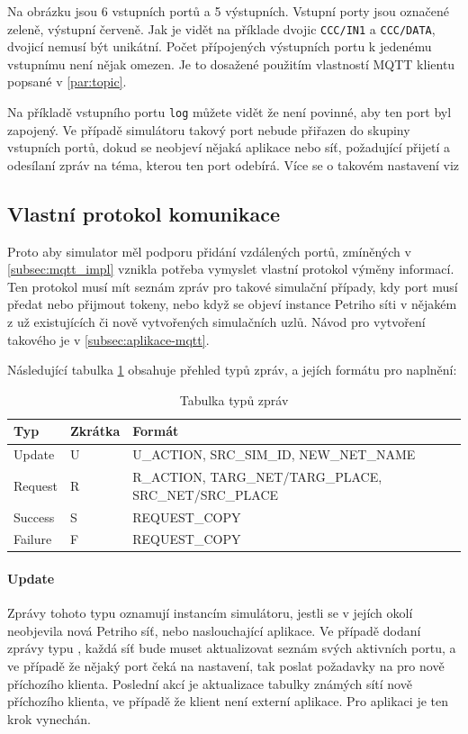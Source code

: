 Na obrázku jsou 6 vstupních portů a 5 výstupních. Vstupní porty jsou označené zeleně, výstupní červeně. Jak je vidět na příklade dvojic \texttt{CCC/IN1} a \texttt{CCC/DATA}, dvojicí nemusí být unikátní. Počet přípojených výstupních portu k jedenému vstupnímu není nějak omezen. Je to dosažené použitím vlastností MQTT klientu popsané v \ref{par:topic}.

Na příkladě vstupního portu \texttt{log} můžete vidět že není povinné, aby ten port byl zapojený. Ve případě simulátoru takový port nebude přiřazen do skupiny vstupních portů, dokud se neobjeví nějaká aplikace nebo síť, požadující přijetí a odesílaní zpráv na téma, kterou ten port odebírá. Více se o takovém nastavení viz 

\subsection{Vlastní protokol komunikace}
Proto aby simulator měl podporu přidání vzdálených portů, zmíněných v \ref{subsec:mqtt_impl} vznikla potřeba vymyslet vlastní protokol výměny informací. Ten protokol musí mít seznám zpráv pro takové simulační případy, kdy port musí předat nebo přijmout tokeny, nebo když se objeví instance Petriho síti v nějakém z už existujících či nově vytvořených simulačních uzlů. Návod pro vytvoření takového je v \ref{subsec:aplikace-mqtt}.

Následující tabulka \ref{tab:mqtt-msg-types} obsahuje přehled typů zpráv, a jejích formátu pro naplnění:

\begin{table}[H]
	\vskip6pt
	\caption{Tabulka typů zpráv}
    \vskip6pt
	\centering
	\begin{tabular}{llllr}
		\toprule
		Typ & Zkrátka & Formát \\
    \midrule
    Update & U & U\_ACTION, SRC\_SIM\_ID, NEW\_NET\_NAME \\
    Request & R & R\_ACTION, TARG\_NET/TARG\_PLACE, SRC\_NET/SRC\_PLACE \\
    Success & S & REQUEST\_COPY \\
    Failure & F & REQUEST\_COPY \\
		\bottomrule
	\end{tabular}
	\label{tab:mqtt-msg-types}
\end{table}

\paragraph{Update} Zprávy tohoto typu oznamují instancím simulátoru, jestli se v jejích okolí neobjevila nová Petriho síť, nebo naslouchající aplikace. Ve případě dodaní zprávy typu , každá síť bude muset aktualizovat seznám svých aktivních portu, a ve případě že nějaký port čeká na nastavení, tak poslat požadavky na pro nově příchozího klienta. Poslední akcí je aktualizace tabulky známých sítí nově příchozího klienta, ve případě že klient není externí aplikace. Pro aplikaci je ten krok vynechán.

